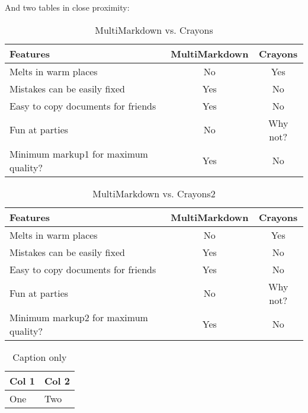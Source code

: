 And two tables in close proximity:

\begin{table}[htbp]
\begin{minipage}{\linewidth}
\setlength{\tymax}{0.5\linewidth}
\centering
\small
\caption{MultiMarkdown vs. Crayons}
\label{multimarkdownvs.crayons}
\begin{tabular}{@{}lcc@{}} \toprule
Features&MultiMarkdown&Crayons\\
\midrule
Melts in warm places&No&Yes\\
Mistakes can be easily fixed&Yes&No\\
Easy to copy documents for friends&Yes&No\\
Fun at parties&No&Why not?\\

\midrule
Minimum markup1 for maximum quality?&Yes&No\\

\bottomrule

\end{tabular}
\end{minipage}
\end{table}


\begin{table}[htbp]
\begin{minipage}{\linewidth}
\setlength{\tymax}{0.5\linewidth}
\centering
\small
\caption{MultiMarkdown vs. Crayons2}
\label{multimarkdownvs.crayons2}
\begin{tabular}{@{}lcc@{}} \toprule
Features&MultiMarkdown&Crayons\\
\midrule
Melts in warm places&No&Yes\\
Mistakes can be easily fixed&Yes&No\\
Easy to copy documents for friends&Yes&No\\
Fun at parties&No&Why not?\\

\midrule
Minimum markup2 for maximum quality?&Yes&No\\

\bottomrule

\end{tabular}
\end{minipage}
\end{table}


\begin{table}[htbp]
\begin{minipage}{\linewidth}
\setlength{\tymax}{0.5\linewidth}
\centering
\small
\caption{Caption only}
\label{captiononly}
\begin{tabular}{@{}ll@{}} \toprule
Col 1&Col 2\\
\midrule
One&Two \\

\bottomrule

\end{tabular}
\end{minipage}
\end{table}





